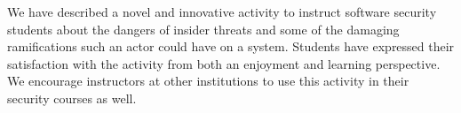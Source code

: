 \documentclass[conference]{IEEEtran}
\begin{document}
We have described a novel and innovative activity to instruct software security students about the dangers of insider threats and some of the damaging ramifications such an actor could have on a system. Students have expressed their satisfaction with the activity from both an enjoyment and learning perspective. We encourage instructors at other institutions to use this activity in their security courses as well.


\balance



\end{document}
